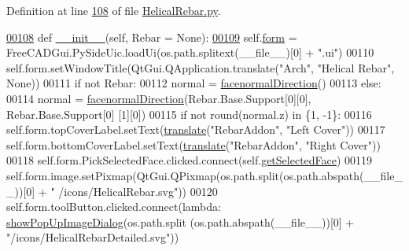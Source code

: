 Definition at line \hyperlink{HelicalRebar_8py_source_l00108}{108} of file \hyperlink{HelicalRebar_8py_source}{Helical\+Rebar.\+py}.


\begin{DoxyCode}
\hypertarget{classHelicalRebar_1_1__HelicalRebarTaskPanel.tex_l00108}{}\hyperlink{classHelicalRebar_1_1__HelicalRebarTaskPanel_a1bc9ff9f8e2cdbf9f12d974dd77c8e24}{00108}     \textcolor{keyword}{def }\hyperlink{classHelicalRebar_1_1__HelicalRebarTaskPanel_a1bc9ff9f8e2cdbf9f12d974dd77c8e24}{\_\_init\_\_}(self, Rebar = None):
\hypertarget{classHelicalRebar_1_1__HelicalRebarTaskPanel.tex_l00109}{}\hyperlink{classHelicalRebar_1_1__HelicalRebarTaskPanel_abfda021716a5b0cd386be846e989ea5f}{00109}         self.\hyperlink{classHelicalRebar_1_1__HelicalRebarTaskPanel_abfda021716a5b0cd386be846e989ea5f}{form} = FreeCADGui.PySideUic.loadUi(os.path.splitext(\_\_file\_\_)[0] + \textcolor{stringliteral}{".ui"})
00110         self.form.setWindowTitle(QtGui.QApplication.translate(\textcolor{stringliteral}{"Arch"}, \textcolor{stringliteral}{"Helical Rebar"}, \textcolor{keywordtype}{None}))
00111         \textcolor{keywordflow}{if} \textcolor{keywordflow}{not} Rebar:
00112             normal = \hyperlink{namespaceRebarfunc_a3a8c123c290609baec3a547c20a561b9}{facenormalDirection}()
00113         \textcolor{keywordflow}{else}:
00114             normal = \hyperlink{namespaceRebarfunc_a3a8c123c290609baec3a547c20a561b9}{facenormalDirection}(Rebar.Base.Support[0][0], Rebar.Base.Support[0]
      [1][0])
00115         \textcolor{keywordflow}{if} \textcolor{keywordflow}{not} round(normal.z) \textcolor{keywordflow}{in} \{1, -1\}:
00116             self.form.topCoverLabel.setText(\hyperlink{namespaceRebarfunc_a1467a55852e36c36c472e222855bb937}{translate}(\textcolor{stringliteral}{"RebarAddon"}, \textcolor{stringliteral}{"Left Cover"}))
00117             self.form.bottomCoverLabel.setText(\hyperlink{namespaceRebarfunc_a1467a55852e36c36c472e222855bb937}{translate}(\textcolor{stringliteral}{"RebarAddon"}, \textcolor{stringliteral}{"Right Cover"}))
00118         self.form.PickSelectedFace.clicked.connect(self.\hyperlink{classHelicalRebar_1_1__HelicalRebarTaskPanel_aea514ce88bde89c57ab88576e7a27230}{getSelectedFace})
00119         self.form.image.setPixmap(QtGui.QPixmap(os.path.split(os.path.abspath(\_\_file\_\_))[0] + \textcolor{stringliteral}{"
      /icons/HelicalRebar.svg"}))
00120         self.form.toolButton.clicked.connect(\textcolor{keyword}{lambda}: \hyperlink{namespacePopUpImage_a8c565620d7de9b4882a44eacb870ad05}{showPopUpImageDialog}(os.path.split
      (os.path.abspath(\_\_file\_\_))[0] + \textcolor{stringliteral}{"/icons/HelicalRebarDetailed.svg"}))

\end{DoxyCode}
